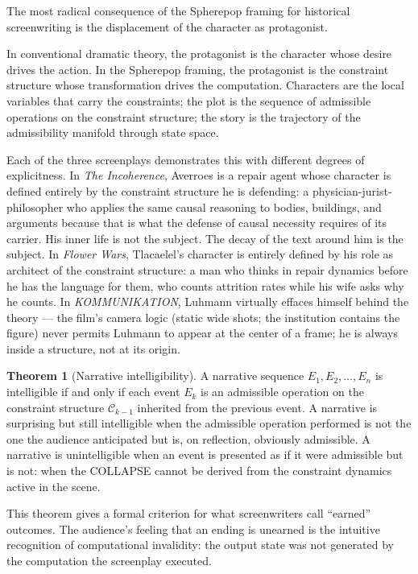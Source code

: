 \documentclass[11pt, a4paper]{article}
\theoremstyle{definition}
\newtheorem{theorem}{Theorem}
\theoremstyle{remark}
\begin{document}
The most radical consequence of the Spherepop framing for historical
screenwriting is the displacement of the character as protagonist.

In conventional dramatic theory, the protagonist is the character whose desire
drives the action. In the Spherepop framing, the protagonist is the constraint
structure whose transformation drives the computation. Characters are the local
variables that carry the constraints; the plot is the sequence of admissible
operations on the constraint structure; the story is the trajectory of the
admissibility manifold through state space.

Each of the three screenplays demonstrates this with different degrees of
explicitness. In \textit{The Incoherence}, Averroes is a repair agent whose
character is defined entirely by the constraint structure he is defending:
a physician-jurist-philosopher who applies the same causal reasoning to bodies,
buildings, and arguments because that is what the defense of causal necessity
requires of its carrier. His inner life is not the subject. The decay of the
text around him is the subject. In \textit{Flower Wars}, Tlacaelel's
character is entirely defined by his role as architect of the constraint
structure: a man who thinks in repair dynamics before he has the language for
them, who counts attrition rates while his wife asks why he counts. In
\textit{KOMMUNIKATION}, Luhmann virtually effaces himself behind the theory
--- the film's camera logic (static wide shots; the institution contains the
figure) never permits Luhmann to appear at the center of a frame; he is always
inside a structure, not at its origin.

\begin{theorem}[Narrative intelligibility]
A narrative sequence $E_1, E_2, \ldots, E_n$ is intelligible if and only if
each event $E_k$ is an admissible operation on the constraint structure
$\mathcal{C}_{k-1}$ inherited from the previous event. A narrative is
surprising but still intelligible when the admissible operation performed
is not the one the audience anticipated but is, on reflection, obviously
admissible. A narrative is unintelligible when an event is presented as if
it were admissible but is not: when the COLLAPSE cannot be derived from the
constraint dynamics active in the scene.
\end{theorem}

This theorem gives a formal criterion for what screenwriters call ``earned''
outcomes. The audience's feeling that an ending is unearned is the intuitive
recognition of computational invalidity: the output state was not generated
by the computation the screenplay executed.
\end{document}
